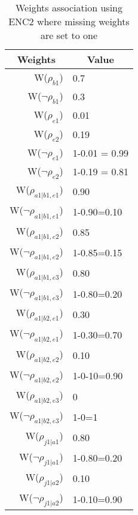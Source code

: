 \begin{table}[htb]
\centering
\caption{Weights association using ENC2 where missing weights are set to one}
\label{weightsEnc2}
\begin{tabular}{rl}
\hline
\multicolumn{1}{c}{Weights} & \multicolumn{1}{c}{Value} \\ \hline
W(\(\rho_{b1}\)) & 0.7 \\
W(\(\neg\rho_{b1}\)) & 0.3 \\
W(\(\rho_{e1}\)) & 0.01 \\
W(\(\rho_{e2}\)) & 0.19 \\
W(\(\neg\rho_{e1}\)) & 1-0.01 = 0.99 \\
W(\(\neg\rho_{e2}\)) & 1-0.19 = 0.81 \\
W(\(\rho_{a1|b1,e1}\)) & 0.90 \\
W(\(\neg\rho_{a1|b1,e1}\)) & 1-0.90=0.10 \\
W(\(\rho_{a1|b1,e2}\)) & 0.85 \\
\multicolumn{1}{l}{W(\(\neg\rho_{a1|b1,e2}\))} & 1-0.85=0.15 \\
W(\(\rho_{a1|b1,e3}\)) & 0.80 \\
W(\(\neg\rho_{a1|b1,e3}\)) & 1-0.80=0.20 \\
W(\(\rho_{a1|b2,e1}\)) & 0.30 \\
W(\(\neg\rho_{a1|b2,e1}\)) & 1-0.30=0.70 \\
W(\(\rho_{a1|b2,e2}\)) & 0.10 \\
W(\(\neg\rho_{a1|b2,e2}\)) & 1-0-10=0.90 \\
W(\(\rho_{a1|b2,e3}\)) & 0 \\
W(\(\neg\rho_{a1|b2,e3}\)) & 1-0=1 \\
W(\(\rho_{j1|a1}\)) & 0.80 \\
W(\(\neg\rho_{j1|a1}\)) & 1-0.80=0.20 \\
W(\(\rho_{j1|a2}\)) & 0.10 \\
W(\(\neg\rho_{j1|a2}\)) & 1-0.10=0.90
\end{tabular}
\end{table}